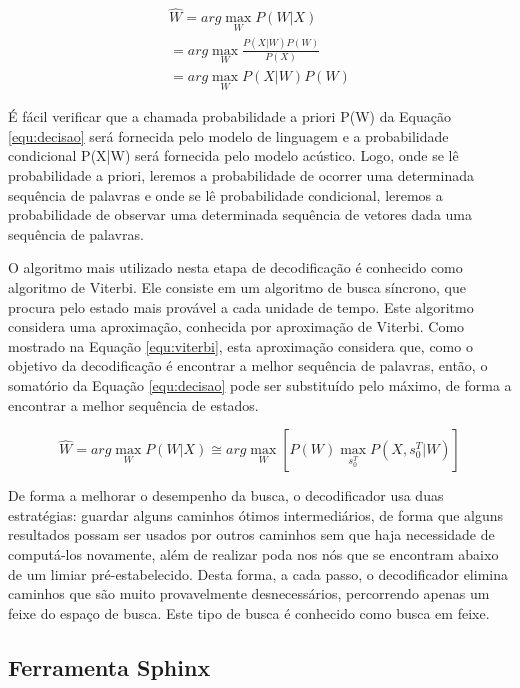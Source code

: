 \documentclass[12pt,a4paper,oneside]{report}
\begin{document}
\begin{equation}
\begin{split}
\widehat{W} = arg \max _{W} P(W|X) \\
= arg \max _{W} \frac{P(X|W)P(W)}{P(X)} \\
= arg \max _{W} P(X|W)P(W)
\end{split}
\label{equ:decisao}
\end{equation}

É fácil verificar que a chamada probabilidade a priori P(W) da Equação \ref{equ:decisao} será fornecida pelo modelo de linguagem e a probabilidade condicional P(X|W) será fornecida pelo modelo acústico. Logo, onde se lê probabilidade a priori, leremos a probabilidade de ocorrer uma determinada sequência de palavras e onde se lê probabilidade condicional, leremos a probabilidade de observar uma determinada sequência de vetores dada uma sequência de palavras.

O algoritmo mais utilizado nesta etapa de decodificação é conhecido como algoritmo de Viterbi. Ele consiste em um
algoritmo de busca síncrono, que procura pelo estado mais provável a cada unidade de tempo. Este algoritmo considera uma
aproximação, conhecida por aproximação de Viterbi. Como mostrado na Equação \ref{equ:viterbi}, esta aproximação
considera que, como o objetivo da decodificação é encontrar a melhor sequência de palavras, então, o somatório da
Equação \ref{equ:decisao} pode ser substituído pelo máximo, de forma a encontrar a melhor sequência de estados.

\begin{equation}
\widehat{W} = arg \max _{W} P(W|X) \cong arg \max _{W} [P(W) \max _{s_{0}^{T}} P(X,s_{0}^{T}|W)]
\label{equ:viterbi}
\end{equation}

De forma a melhorar o desempenho da busca, o decodificador usa duas estratégias: guardar alguns caminhos ótimos intermediários, de forma que alguns resultados possam ser usados por outros caminhos sem que haja necessidade de computá-los novamente, além de realizar poda nos nós que se encontram abaixo de um limiar pré-estabelecido. Desta forma, a cada passo, o decodificador elimina caminhos que são muito provavelmente desnecessários, percorrendo apenas um feixe do espaço de busca. Este tipo de busca é conhecido como busca em feixe.

\subsection{Ferramenta Sphinx}
\end{document}
